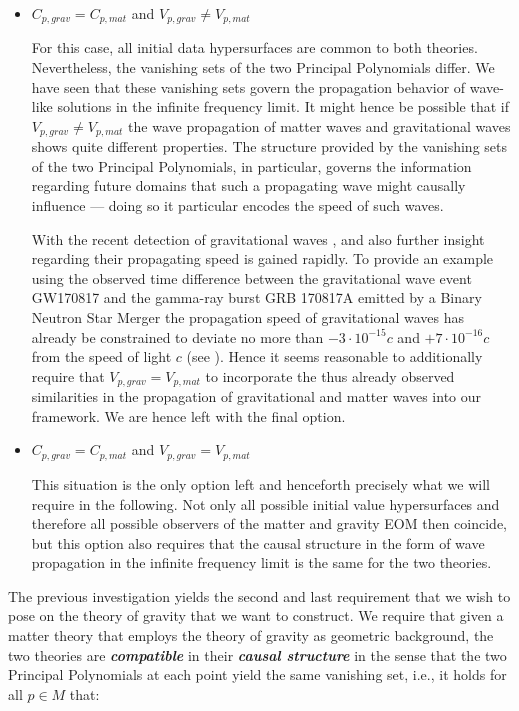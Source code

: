 \documentclass[a4paper,12pt, DIV=14, BCOR=5mm, twoside, headsepline, numbers=noenddot]{scrbook}
\begin{document}
\begin{itemize}
\item $C_{p,grav} = C_{p,mat}$ and $V_{p,grav} \neq V_{p,mat}$ 

For this case, all initial data hypersurfaces are common to both theories. Nevertheless, the vanishing sets of the two Principal Polynomials differ. We have seen that these vanishing sets govern the propagation behavior of wave-like solutions in the infinite frequency limit. It might hence be possible that if $V_{p,grav} \neq V_{p,mat}$ the wave propagation of matter waves and gravitational waves shows quite different properties. The structure provided by the vanishing sets of the two Principal Polynomials, in particular, governs the information regarding future domains that such a propagating wave might causally influence — doing so it particular encodes the speed of such waves. 

With the recent detection of gravitational waves \cite{2017ApJ...848L..12A}, \cite{2017PhRvL.119n1101A} and \cite{2016PhRvL.116f1102A} also further insight regarding their propagating speed is gained rapidly. 
To provide an example using the observed time difference between the gravitational wave event GW170817 and the gamma-ray burst GRB 170817A emitted by a Binary Neutron Star Merger the propagation speed of gravitational waves has already be constrained to deviate no more than $-3\cdot 10^{{-}15}c$ and $+7\cdot 10^{{-}16}c$ from the speed of light $c$ (see \cite{2017ApJ...848L..13A}). Hence it seems reasonable to additionally require that $V_{p,grav} = V_{p,mat}$ to incorporate the thus already observed similarities in the propagation of gravitational and matter waves into our framework. We are hence left with the final option.
\item $C_{p,grav} = C_{p,mat}$ and $V_{p,grav} = V_{p,mat}$ 

This situation is the only option left and henceforth precisely what we will require in the following. Not only all possible initial value hypersurfaces and therefore all possible observers of the matter and gravity EOM then coincide, but this option also requires that the causal structure in the form of wave propagation in the infinite frequency limit is the same for the two theories.  
\end{itemize}
The previous investigation yields the second and last requirement that we wish to pose on the theory of gravity that we want to construct. We require that given a matter theory that employs the theory of gravity as geometric background, the two theories are \textit{\textbf{compatible}} in their \textit{\textbf{causal structure}} in the sense that the two Principal Polynomials at each point yield the same vanishing set, i.e., it holds for all $p \in M$ that: 
\end{document}
